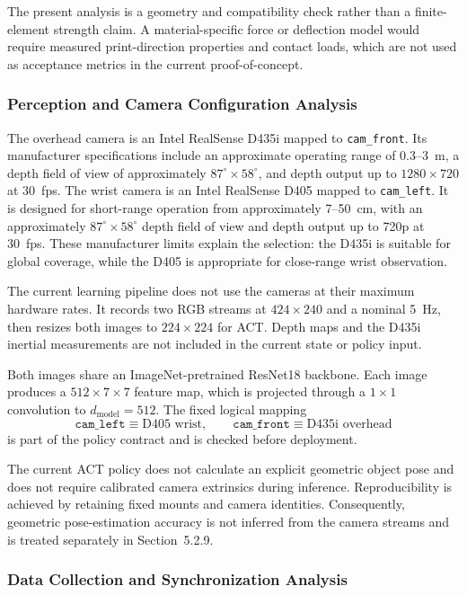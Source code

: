 \documentclass[12pt, letterpaper]{article}
\begin{document}
The present analysis is a geometry and compatibility check rather than a finite-element strength claim. A material-specific force or deflection model would require measured print-direction properties and contact loads, which are not used as acceptance metrics in the current proof-of-concept.

\subsubsection{Perception and Camera Configuration Analysis}

The overhead camera is an Intel RealSense D435i mapped to \texttt{cam\_front}. Its manufacturer specifications include an approximate operating range of 0.3--3~m, a depth field of view of approximately \(87^\circ\times58^\circ\), and depth output up to \(1280\times720\) at 30~fps. The wrist camera is an Intel RealSense D405 mapped to \texttt{cam\_left}. It is designed for short-range operation from approximately 7--50~cm, with an approximately \(87^\circ\times58^\circ\) depth field of view and depth output up to 720p at 30~fps. These manufacturer limits explain the selection: the D435i is suitable for global coverage, while the D405 is appropriate for close-range wrist observation.

The current learning pipeline does not use the cameras at their maximum hardware rates. It records two RGB streams at \(424\times240\) and a nominal 5~Hz, then resizes both images to \(224\times224\) for ACT. Depth maps and the D435i inertial measurements are not included in the current state or policy input.

Both images share an ImageNet-pretrained ResNet18 backbone. Each image produces a \(512\times7\times7\) feature map, which is projected through a \(1\times1\) convolution to \(d_{\mathrm{model}}=512\). The fixed logical mapping
\[
\texttt{cam\_left}\equiv\text{D405 wrist},
\qquad
\texttt{cam\_front}\equiv\text{D435i overhead}
\]
is part of the policy contract and is checked before deployment.

The current ACT policy does not calculate an explicit geometric object pose and does not require calibrated camera extrinsics during inference. Reproducibility is achieved by retaining fixed mounts and camera identities. Consequently, geometric pose-estimation accuracy is not inferred from the camera streams and is treated separately in Section~5.2.9.

\subsubsection{Data Collection and Synchronization Analysis}
\end{document}
